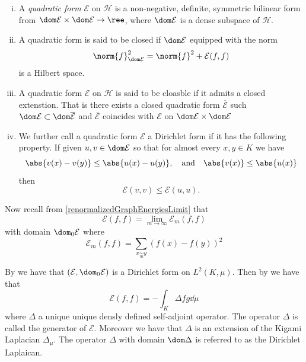  
\begin{defi}
	\begin{enumerate}[(i)]
		\item A \emph{quadratic form} $\mathcal{E}$ on $\mathcal{H}$ is a non-negative, definite, symmetric bilinear form from $\dom \mathcal{E} \times \dom \mathcal{E} \to \ree$, where $\dom \mathcal{E}$ is a dense subspace of $\mathcal{H}$. 
		
		\item A quadratic form is said to be closed if $\dom \mathcal{E}$ equipped with the norm
		\begin{equation}
			\norm{f}^{2}_{\dom \mathcal{E}} = \norm{f}^2 + \mathcal{E}(f,f)
		\end{equation}
		is a Hilbert space.
		\item A quadratic form $\mathcal{E}$ on $\mathcal{H}$ is said to be cloasble if it admits a closed extenstion. That is there exists a closed quadratic form $\overline{\mathcal{E}}$ such $\dom \mathcal{E} \subset \dom \overline{\mathcal{E}}$ and $\overline{\mathcal{E}}$ coincides with $\mathcal{E}$ on $\dom \mathcal{E} \times \dom \mathcal{E}$
		\item  We further call a quadratic form $\mathcal{E}$ a Dirichlet form if it has the following property. If given $u, v \in \dom \mathcal{E}$ so that for almost every $x,y \in K$ we have
		\begin{equation}\label{contraction}
		\abs{v(x) - v(y)} \leq \abs{u(x) - u(y)}, \quad \text{and} \quad \abs{v(x)} \leq \abs{u(x)}
		\end{equation}
		then 
		\begin{equation}
			\mathcal{E}(v,v) \leq \mathcal{E}(u,u).
		\end{equation}
	\end{enumerate} 
\end{defi} 
 
 
 
Now recall from \cref{renormalizedGraphEnergiesLimit} that 
\begin{equation}
	\mathcal{E}(f,f) = \lim_{m \to \infty} \mathcal{E}_m(f,f)
\end{equation}
with domain $\dom_{0} \mathcal{E}$ where
\begin{equation}
	\mathcal{E}_{m}(f,f) =  \sum_{x \underset{m}{\sim} y} (f(x)-f(y))^2
\end{equation}

By \cite[theorem 4.1]{specAnal}  we have that $(\mathcal{E}, \dom_{0}\mathcal{E})$ is a Dirichlet form on $L^{2}(K, \mu)$.  Then by \cite[Lemma 1.3.3]{fabriceDirichelt} we have that 
\begin{equation}
	\mathcal{E}(f,f) = - \int_{K}\Delta f g \dd \mu
\end{equation}
where $\Delta$ a unique unique densly defined self-adjoint operator. The operator $\Delta$ is called the generator of $\mathcal{E}$. Moreover we have that $\Delta$ is an extension of the Kigami Laplacian $\Delta_{\mu}$. The operator $\Delta$ with domain $\dom \Delta$ is referred to as the Dirichlet Laplaican. 

